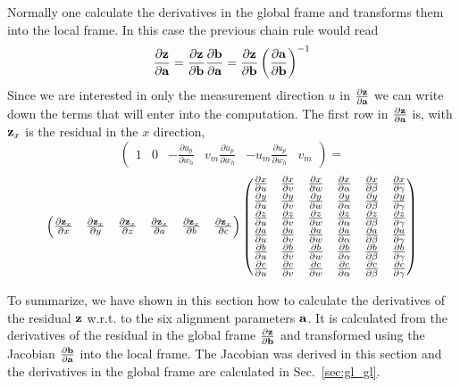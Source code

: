 \documentclass{article}
\def\vec#1{\ensuremath{\mathrm{\bf #1}}}
\def\partder#1#2{\ensuremath{\frac{\partial #1}{\partial #2}}}
\begin{document}
Normally one calculate the derivatives in the global frame and transforms them into the 
local frame. In this case the previous chain rule would read
\[
\partder{\vec{z}}{\vec{a}}= 
\partder{\vec{z}}{\vec{b}}  \partder{\vec{b}}{\vec{a}} =
\partder{\vec{z}}{\vec{b}}  \left(\partder{\vec{a}}{\vec{b}} \right)^{-1} 
\]
Since we are interested in only the measurement direction $u$ in $\partder{\vec{z}}{\vec{a}}$ 
we can write down the terms that will enter into the computation. The first row in 
$\partder{\vec{z}}{\vec{a}}$ is, with $\vec{z}_x$ is the residual in the $x$ direction,
\[
\begin{pmatrix}
1 & 0 & -\partder{u_p}{w_h} & v_m \partder{u_p}{w_h} & -u_m \partder{u_p}{w_h} & v_m
\end{pmatrix}
=
\]
\[
\begin{pmatrix}
\partder{\vec{z}_x}{x} & \partder{\vec{z}_x}{y} & \partder{\vec{z}_x}{z} & 
\partder{\vec{z}_x}{a} & \partder{\vec{z}_x}{b} & \partder{\vec{z}_x}{c} 
\end{pmatrix}
\begin{pmatrix}
\partder{x}{u} & \partder{x}{v} & \partder{x}{w} 	& \partder{x}{\alpha} & \partder{x}{\beta} & \partder{x}{\gamma}  \\ 
\partder{y}{u} & \partder{y}{v} & \partder{y}{w} 	& \partder{y}{\alpha} & \partder{y}{\beta} & \partder{y}{\gamma}  \\ 
\partder{z}{u} & \partder{z}{v} & \partder{z}{w} 	& \partder{z}{\alpha} & \partder{z}{\beta} & \partder{z}{\gamma}  \\ 
\partder{a}{u} & \partder{a}{v} & \partder{a}{w} 	& \partder{a}{\alpha} & \partder{a}{\beta} & \partder{a}{\gamma}  \\ 
\partder{b}{u} & \partder{b}{v} & \partder{b}{w} 	& \partder{b}{\alpha} & \partder{b}{\beta} & \partder{b}{\gamma}  \\ 
\partder{c}{u} & \partder{c}{v} & \partder{c}{w} 	& \partder{c}{\alpha} & \partder{c}{\beta} & \partder{c}{\gamma} 
\end{pmatrix}
\]


To summarize, we have shown in this section how to calculate the derivatives of the 
residual $\vec{z}$ w.r.t. to the six alignment parameters \vec{a}.  
It is calculated from the derivatives of the residual in the global frame $\partder{\vec{z}}{\vec{b}}$ 
and transformed using the Jacobian $\partder{\vec{b}}{\vec{a}}$ into the local frame. 
The Jacobian was derived in this section and the derivatives in the global frame are 
calculated in Sec.~\ref{sec:gl_gl}.
\end{document}
